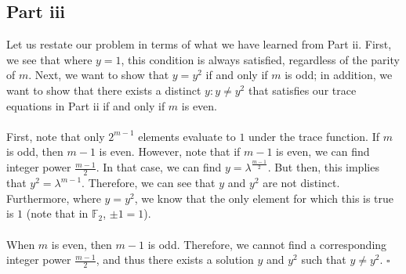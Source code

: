 \documentclass[letterpaper]{article}
\newcommand*{\QED}{\hfill\ensuremath{\square}}%
\begin{document}
\subsection{Part iii}
\label{sec:7Partiii}

Let us restate our problem in terms of what we have learned from Part ii.
First, we see that where $ y = 1 $, this condition is always satisfied, regardless of the parity of $ m $.
Next, we want to show that $ y = y^2 $ if and only if $ m $ is odd; in addition, we want to show that there exists a distinct $ y : y \neq y^2 $ that satisfies our trace equations in Part ii if and only if $ m $ is even.
\\ \\
First, note that only $ 2^{m-1} $ elements evaluate to $ 1 $ under the trace function.
If $ m $ is odd, then $ m - 1 $ is even.
However, note that if $ m - 1 $ is even, we can find integer power $ \frac{m - 1}{2} $.
In that case, we can find $ y = \lambda^{\frac{m - 1}{2}} $.
But then, this implies that $ y^2 = \lambda^{m - 1} $.
Therefore, we can see that $ y $ and $ y^2 $ are not distinct.
Furthermore, where $ y = y^2 $, we know that the only element for which this is true is $ 1 $ (note that in $ \mathbb{F}_2 $, $ \pm 1 = 1 $).
\\ \\
When $ m $ is even, then $ m - 1 $ is odd.
Therefore, we cannot find a corresponding integer power $ \frac{m - 1}{2} $, and thus there exists a solution $ y $ and $ y^2 $ such that $ y \neq y^2 $.
\QED{}
\end{document}
